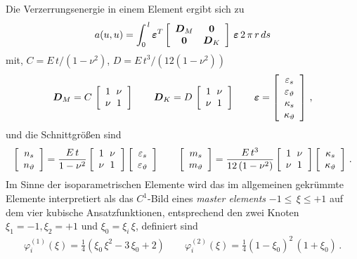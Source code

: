 Die Verzerrungsenergie in einem Element ergibt sich zu
\begin{align}
a(u,u) = \int_0^{\,l} \vek \varepsilon^T \left[ \barr {c c} \vek D_M & \vek 0 \\ \vek 0 &
\vek D_K \earr \right] \,\vek \varepsilon\,2\,\pi\,r\,ds
\end{align}
mit, $C = E\,t/(1-\nu^2)$, $D = E\,t^3/(12(1-\nu^2))$
\begin{align}
\vek D_M = C\,\left[ \barr {c@{\hspace{2mm}} c@{\hspace{2mm}}} 1 &\nu \\ \nu & 1 \earr
\right] \qquad \vek D_K = D\,\left[ \barr {c@{\hspace{2mm}} c@{\hspace{2mm}}} 1 &\nu \\
\nu & 1 \earr \right] \qquad \vek \varepsilon = \left[ \barr{ c} \varepsilon_s \\
\varepsilon_\vartheta \\ \kappa_s \\ \kappa_\vartheta \earr \right]\,,
\end{align}
und die Schnittgr\"{o}{\ss}en sind
\begin{align}
\left[ \barr {c} n_s  \\ n_\vartheta \earr \right] = \frac{E\,t}{1 - \nu^2} \left[ \barr
{c@{\hspace{2mm}} c@{\hspace{2mm}}} 1 &\nu \\ \nu & 1 \earr \right] \left[ \barr{ c}
\varepsilon_s \\ \varepsilon_\vartheta \earr \right] \qquad \left[ \barr {c} m_s  \\
m_\vartheta \earr \right] = \frac{E\,t^3}{12\,(1 - \nu^2)} \left[ \barr
{c@{\hspace{2mm}} c@{\hspace{2mm}}} 1 &\nu \\ \nu & 1 \earr \right] \left[ \barr{ c}
\kappa_s \\ \kappa_\vartheta \earr \right]\,.
\end{align}
Im Sinne der isoparametrischen Elemente wird das im allgemeinen gekr\"{u}mmte Elemente interpretiert als das $C^1$-Bild eines {\em master elements\/} $-1 \leq \,\xi \leq +1$ auf dem vier kubische Ansatzfunktionen, entsprechend den zwei Knoten $\xi_1 = - 1, \xi_2 = + 1$  und $\xi_0 = \xi_i\,\xi$, definiert sind
\begin{align}
\varphi^{(1)}_i(\xi) = \frac{1}{4}(\xi_0\,\xi^2 - 3\,\xi_0 + 2) \qquad
\varphi^{(2)}_i(\xi) = \frac{1}{4}( 1 - \xi_0)^2\,(1 + \xi_0)\,.
\end{align}
